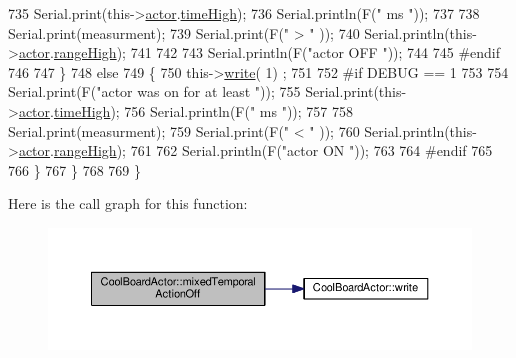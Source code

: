 \begin{DoxyCode}
735             Serial.print(this->\hyperlink{class_cool_board_actor_a8f190db9f7a39fddbcef7f152da970e9}{actor}.\hyperlink{struct_cool_board_actor_1_1state_a54cd4976b56aeaa6274fe0576aaebb0f}{timeHigh});
736             Serial.println(F(\textcolor{stringliteral}{" ms "}));
737 
738             Serial.print(measurment);
739             Serial.print(F(\textcolor{stringliteral}{" > "} ));
740             Serial.println(this->\hyperlink{class_cool_board_actor_a8f190db9f7a39fddbcef7f152da970e9}{actor}.\hyperlink{struct_cool_board_actor_1_1state_a6e5cd6c5cd44e2decfd8d4df1853f8e3}{rangeHigh});
741 
742             
743             Serial.println(F(\textcolor{stringliteral}{"actor OFF "}));
744 
745 \textcolor{preprocessor}{        #endif}
746 
747         \}
748         \textcolor{keywordflow}{else} 
749         \{
750             this->\hyperlink{class_cool_board_actor_a958786ff01ea1056ee72c72d439f86da}{write}( 1) ;
751 
752 \textcolor{preprocessor}{        #if DEBUG == 1 }
753             
754             Serial.print(F(\textcolor{stringliteral}{"actor was on for at least "}));
755             Serial.print(this->\hyperlink{class_cool_board_actor_a8f190db9f7a39fddbcef7f152da970e9}{actor}.\hyperlink{struct_cool_board_actor_1_1state_a54cd4976b56aeaa6274fe0576aaebb0f}{timeHigh});
756             Serial.println(F(\textcolor{stringliteral}{" ms "}));
757 
758             Serial.print(measurment);
759             Serial.print(F(\textcolor{stringliteral}{" < "} ));
760             Serial.println(this->\hyperlink{class_cool_board_actor_a8f190db9f7a39fddbcef7f152da970e9}{actor}.\hyperlink{struct_cool_board_actor_1_1state_a6e5cd6c5cd44e2decfd8d4df1853f8e3}{rangeHigh});
761 
762             Serial.println(F(\textcolor{stringliteral}{"actor ON "}));
763 
764 \textcolor{preprocessor}{        #endif              }
765 
766         \}           
767     \}
768 
769 \}
\end{DoxyCode}
Here is the call graph for this function\+:\nopagebreak
\begin{figure}[H]
\begin{center}
\leavevmode
\includegraphics[width=350pt]{dc/d69/class_cool_board_actor_a00b29c4abf0388551aa6812372113cf1_cgraph}
\end{center}
\end{figure}
